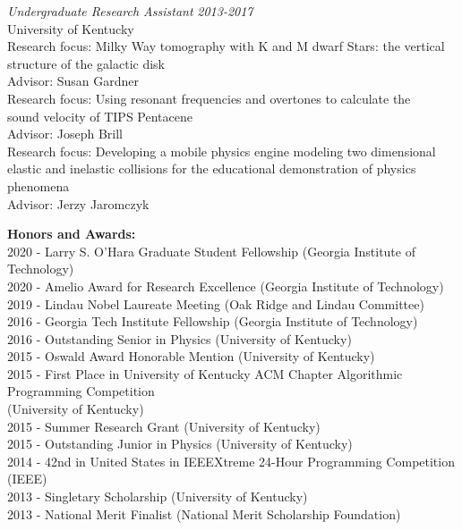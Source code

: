 \documentclass[11pt]{article}
\begin{document}
\begin{flushleft}
  \vspace{8px}
	
  \textit{Undergraduate Research Assistant} \hfill \textit{2013-2017}\\
  University of Kentucky\\
  Research focus: Milky Way tomography with K and M dwarf Stars: the vertical\\ structure of the galactic disk\\ 
  Advisor: Susan Gardner\\
  \vspace{2px}
  Research focus: Using resonant frequencies and overtones to calculate the\\ sound velocity of TIPS Pentacene\\
  Advisor: Joseph Brill\\
  \vspace{2px}
  Research focus: Developing a mobile physics engine modeling two dimensional\\ elastic and inelastic collisions for the educational demonstration of physics phenomena\\
  Advisor: Jerzy Jaromczyk\\
  
  \vspace{8px}
	
  \textbf{Honors and Awards:}\\
  2020 - Larry S. O'Hara Graduate Student Fellowship (Georgia Institute of Technology)\\
  2020 - Amelio Award for Research Excellence (Georgia Institute of Technology)\\
  2019 - Lindau Nobel Laureate Meeting (Oak Ridge and Lindau Committee)\\
  2016 - Georgia Tech Institute Fellowship (Georgia Institute of Technology)\\
  2016 - Outstanding Senior in Physics (University of Kentucky)\\
  2015 - Oswald Award Honorable Mention (University of Kentucky)\\
  2015 - First Place in University of Kentucky ACM Chapter Algorithmic Programming Competition\\ 
  \hspace{29px} (University of Kentucky)\\
  2015 - Summer Research Grant (University of Kentucky)\\
  2015 - Outstanding Junior in Physics (University of Kentucky)\\
  2014 - 42nd in United States in IEEEXtreme 24-Hour Programming Competition (IEEE)\\
  2013 - Singletary Scholarship (University of Kentucky)\\
  2013 - National Merit Finalist (National Merit Scholarship Foundation)\\


\end{flushleft}
\end{document}
